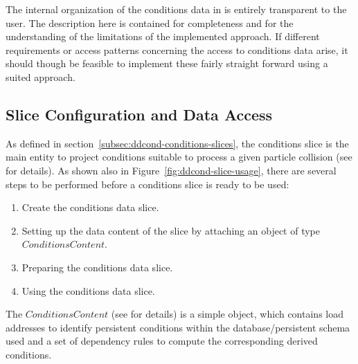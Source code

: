\documentclass[10pt,a4paper]{article}
\begin{document}
\noindent
The internal organization of the conditions data in \DDC is entirely 
transparent to the user. The description here is contained for
completeness and for the understanding of the limitations of the implemented
approach. If different requirements or access patterns concerning the 
access to conditions data arise, it should though be feasible to implement
these fairly straight forward using a suited approach.

\subsection{Slice Configuration and Data Access}
\label{subsec:ddcond-data-access}

\noindent
As defined in section~\ref{subsec:ddcond-conditions-slices}, the conditions slice
is the main entity to project conditions suitable to process a given particle
collision (see  for details). 
As shown also in Figure~\ref{fig:ddcond-slice-usage}, there are 
several steps to be performed before a conditions slice is ready to be used:
\begin{enumerate}\itemcompact
\item Create the conditions data slice.
\item Setting up the data content of the slice by attaching an object of type
      $ConditionsContent$.
\item Preparing the conditions data slice.
\item Using the conditions data slice.
\end{enumerate}

\noindent
The $ConditionsContent$ (see  for details) 
is a simple object, which contains load addresses
to identify persistent conditions within the database/persistent schema 
used and a set of dependency rules to compute the corresponding derived conditions.
\end{document}
